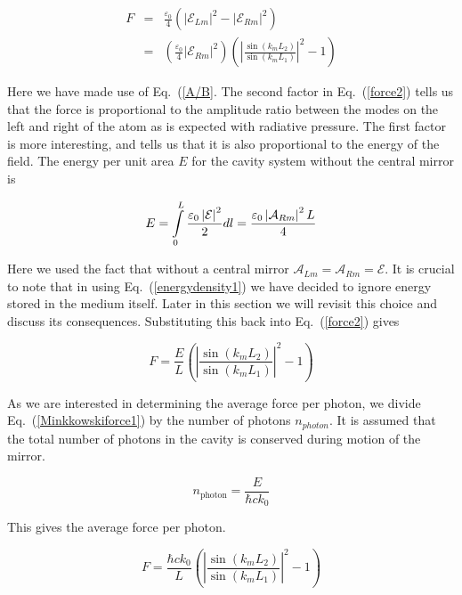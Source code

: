 \documentclass[twocolumn,english,pra,aps,superscriptaddress,floatfix]{revtex4-1}
\begin{document}
\begin{eqnarray}
F&=&\frac{\varepsilon_{0}}{4}\left(\left|\mathcal{E}_{Lm}\right|^{2}-\left|\mathcal{E}_{Rm}\right|^{2}\right)\nonumber \\ &=&\left(\frac{\varepsilon_{0}}{4}\left|\mathcal{E}_{Rm}\right|^{2}\right)\left(\left|\frac{\sin(k_{m}L_{2})}{\sin(k_{m}L_{1})}\right|^{2}-1\right)
\label{force2}
\end{eqnarray}

Here we have made use of Eq.\ (\ref{A/B}. The second factor in Eq.\ (\ref{force2}) tells us that the force is proportional to the amplitude ratio between the modes on the left and right of the atom as is expected with radiative pressure. The first factor is more interesting, and tells us that it is also proportional to the energy of the field. The energy per unit area $E$ for the cavity system without the central mirror is

\begin{equation}
E=\intop_{0}^{L}\frac{\varepsilon_{0}\left|\mathcal{E}\right|^{2}}{2}dl=\frac{\varepsilon_{0}\left|\mathcal{A}_{Rm}\right|^{2}L}{4}
\label{energydensity1}
\end{equation}
 
Here we used the fact that without a central mirror $\mathcal{A}_{Lm}=\mathcal{A}_{Rm}=\mathcal{E}$. It is crucial to note that in using Eq.\ (\ref{energydensity1}) we have decided to ignore energy stored in the medium itself.  Later in this section we will revisit this choice and discuss its consequences.  
Substituting this back into Eq.\ (\ref{force2}) gives

\begin{equation}
F=\frac{E}{L}\left(\left|\frac{\sin(k_{m}L_{2})}{\sin(k_{m}L_{1})}\right|^{2}-1\right)
\label{Minkkowskiforce1}
\end{equation}

As we are interested in determining the average force per photon, we divide Eq.\ (\ref{Minkkowskiforce1}) by the number of photons $n_{photon}$.  It is assumed that the total number of photons in the cavity is conserved during motion of the mirror.  

\begin{equation}
n_{\mathrm{photon}}=\frac{E}{\hbar ck_0}
\label{photonnumber}
\end{equation}

This gives the average force per photon.

\begin{equation}
F=\frac{\hbar ck_0}{L}\left(\left|\frac{\sin(k_{m}L_{2})}{\sin(k_{m}L_{1})}\right|^{2}-1\right)
\label{Minkowskiforce2}
\end{equation}
\end{document}
